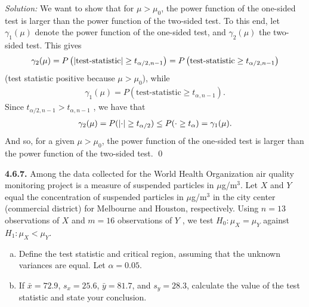 \documentclass{book}
\theoremstyle{definition}
\newcommand{\al}{\alpha}
\newcommand{\lp}{\left(}
\newcommand{\rp}{\right)}
\begin{document}
\noindent \textit{Solution:} We want to show that for $\mu > \mu_0$, the power function of the one-sided test is larger than the power function of the two-sided test. To this end, let $\gamma_1(\mu)$ denote the power function of the one-sided test, and $\gamma_2(\mu)$ the two-sided test. This gives
\begin{align}
\gamma_2(\mu) = P\lp \abs{\text{test-statistic}} \geq t_{\alpha/2,n-1} \rp = P\lp {\text{test-statistic}} \geq t_{\alpha/2,n-1} \rp
\end{align}
(test statistic positive because $\mu > \mu_0$), while 
\begin{align}
\gamma_1(\mu) = P\lp \text{test-statistic} \geq t_{\alpha,n-1} \rp.
\end{align}
Since $t_{\alpha/2,n-1} > t_{\alpha,n-1} $ , we have that 
\begin{align}
\gamma_2(\mu) = P(\abs{\cdot} \geq t_{\alpha/2}) \leq P(\cdot \geq t_\al) = \gamma_1(\mu).
\end{align}
And so, for a given $\mu > \mu_0$, the power function of the one-sided test is larger than the power function of the two-sided test. \qed





















\newpage
\noindent \textbf{4.6.7.} Among the data collected for the World Health Organization air quality
monitoring project is a measure of suspended particles in $\mu$g/m$^3$. Let $X$ and $Y$ equal
the concentration of suspended particles in $\mu$g/m$^3$ in the city center (commercial
district) for Melbourne and Houston, respectively. Using $n = 13$ observations of $X$
and $m = 16$ observations of $Y$ , we test $H_0 : \mu_X = \mu_Y$ against $H_1 : \mu_X < \mu_Y$.

\begin{enumerate}[(a)]
	\item Define the test statistic and critical region, assuming that the unknown variances are equal. Let $\al = 0.05$.
	\item If $\bar{x} = 72.9$, $s_x = 25.6$, $\bar{y} = 81.7$, and $s_y = 28.3$, calculate the value of the
	test statistic and state your conclusion.
\end{enumerate}
\end{document}
